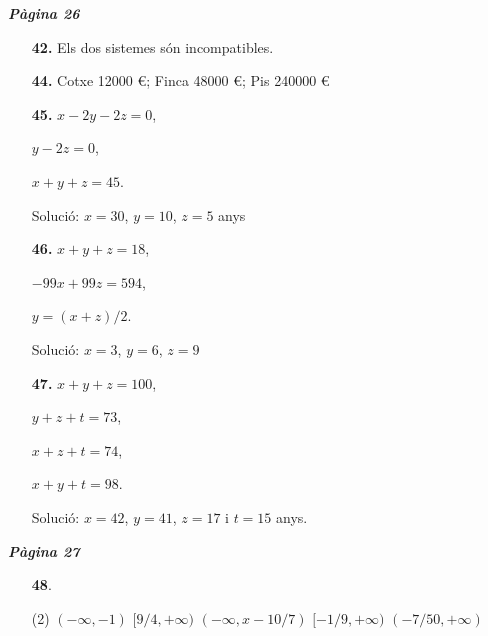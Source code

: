 \documentclass[a4paper, pdf, twoside]{book}
\begin{document}
\begin{multicols}{2}
{\textbf{\em Pàgina 26}} \hrulefill
\begin{enumerate}
\vspace{0.25cm}
\item[\fontfamily{phv}\selectfont\color{blue}\textbf{42. }] 
Els dos sistemes són incompatibles.
 \end{enumerate}
\begin{enumerate}
\vspace{0.25cm}
\item[\fontfamily{phv}\selectfont\color{blue}\textbf{44. }] 
Cotxe 12000 \euro {}; Finca 48000 \euro {}; Pis 240000 \euro {}
\vspace{0.25cm}
\item[\fontfamily{phv}\selectfont\color{blue}\textbf{45. }] 
$x-2y-2z=0$,\par $y-2z=0$,\par $x+y+z=45$.\par Solució: $x=30$, $y=10$, $z=5$ anys
\vspace{0.25cm}
\item[\fontfamily{phv}\selectfont\color{blue}\textbf{46. }] 
$x+y+z=18$,\par $-99x+99z=594$,\par $y=(x+z)/2$.\par Solució: $x=3$, $y=6$, $z=9$
\vspace{0.25cm}
\item[\fontfamily{phv}\selectfont\color{blue}\textbf{47. }] 
$x+y+z=100$,\par $y+z+t=73$,\par $x+z+t=74$,\par $x+y+t=98$.\par Solució: $x=42$, $y=41$, $z=17$ i $t=15$ anys.
 \end{enumerate}
\vspace{0.3cm}


{\textbf{\em Pàgina 27}} \hrulefill
\begin{enumerate}
\vspace{0.25cm}



 \item[\fontfamily{phv}\selectfont\color{blue}\textbf{48}. ] 
 \begin{tasks}[column-sep=1em, item-indent=1.3333em](2)
	 \task $(-\infty ,-1)$
	 \task $[9/4,+\infty )$
	 \task $(-\infty ,x-10/7)$
	 \task $[-1/9,+\infty )$
	 \task $(-7/50,+\infty )$
\end{tasks}
 \end{enumerate}
\begin{enumerate}
\vspace{0.25cm}



\end{enumerate}
\end{multicols}
\end{document}
